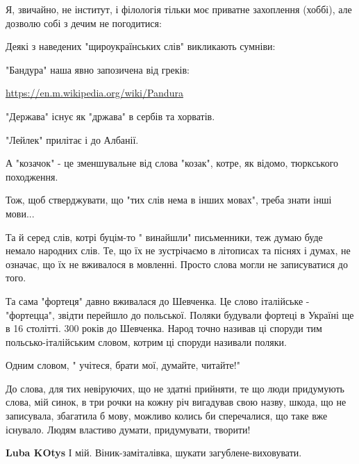 \begin{itemize}
Я, звичайно, не інститут, і філологія тільки моє приватне захоплення (хоббі), але дозволю собі з дечим не погодитися:

Деякі з наведених "щироукраїнських слів" викликають сумніви:

"Бандура" наша явно запозичена від греків:

\url{https://en.m.wikipedia.org/wiki/Pandura}

"Держава" існує як "држава" в сербів та хорватів.

"Лейлек" прилітає і до Албанії.

А "козачок" - це зменшувальне від слова "козак", котре, як відомо, тюркського
походження.

Тож, щоб стверджувати, що "тих слів нема в інших мовах", треба знати інші
мови...

Та й серед слів, котрі буцім-то " винайшли" письменники, теж думаю буде немало
народних слів. Те, що їх не зустрічаємо в літописах та піснях і думах, не
означає, що їх не вживалося в мовленні. Просто слова могли не записуватися до
того.

Та сама "фортеця" давно вживалася до Шевченка. Це слово італійське -
"фортецца", звідти перейшло до польської. Поляки будували фортеці в Україні ще
в 16 столітті. 300 років до Шевченка. Народ точно називав ці споруди тим
польсько-італійським словом, котрим ці споруди називали поляки.

Одним словом, " учітеся, брати мої, думайте, читайте!"

 

До слова, для тих невіруючих, що не здатні прийняти, те що люди придумують
слова, мій синок, в три рочки на кожну річ вигадував свою назву, шкода, що не
записувала, збагатила б мову, можливо колись би сперечалися, що таке вже
існувало. Людям властиво думати, придумувати, творити!

\begin{itemize}
 
\textbf{Luba KOtys} І мій. Віник-заміталівка, шукати загублене-виховувати.
\end{itemize}


\end{itemize}
